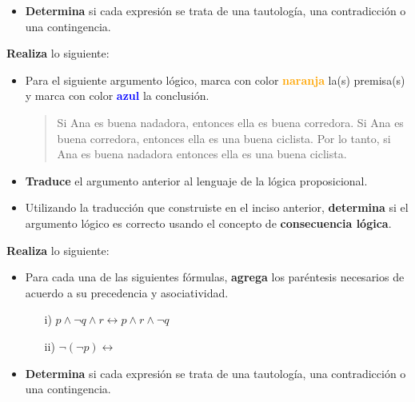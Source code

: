 \documentclass[oneside]{style}
\begin{document}
\begin{questions}[label=\protect\circled{\bfseries\arabic*}]
{\begin{itemize}
            \item \textbf{Determina} si cada expresión se trata de una 
            tautología, una contradicción o una contingencia.
        \end{itemize}
    }

    \newpage
    \question
    {
        \textbf{Realiza} lo siguiente:
        \begin{itemize}
            \item Para el siguiente argumento lógico, marca con color 
            \textcolor{orange}{\textbf{naranja}} la(s) premisa(s) y marca con 
            color \textcolor{blue}{\textbf{azul}} la conclusión.

            \begin{quote}
                \centering
                Si Ana es buena nadadora, entonces ella es buena corredora. 
                Si Ana es buena corredora, entonces ella es una buena ciclista. 
                Por lo tanto, si Ana es buena nadadora entonces ella es una 
                buena ciclista.
            \end{quote}
    
            \item \textbf{Traduce} el argumento anterior al lenguaje de la lógica 
            proposicional.
    
            \item Utilizando la traducción que construiste en el inciso anterior, 
            \textbf{determina} si el argumento lógico es correcto usando el 
            concepto de \textbf{consecuencia lógica}.
        \end{itemize}
    }

    \question
    {
        \textbf{Realiza} lo siguiente:
        \begin{itemize}
            \item Para cada una de las siguientes fórmulas, \textbf{agrega} 
            los paréntesis necesarios de acuerdo a su precedencia y 
            asociatividad. 
            \begin{itemize}
                \item[i)] $p \land \neg q \land r \leftrightarrow p \land r 
                \land \neg q$
                \item[ii)] $\neg (\neg p) \leftrightarrow$
            \end{itemize}
            
            \item \textbf{Determina} si cada expresión se trata de una 
            tautología, una contradicción o una contingencia.
        \end{itemize}
    }


\end{questions}
\end{document}
